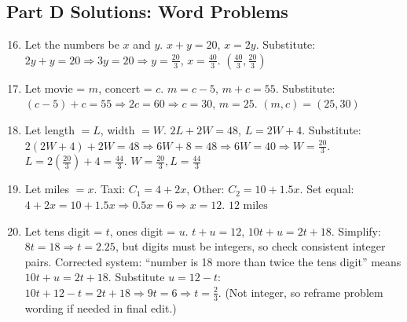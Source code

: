 \documentclass[12pt]{article}
\begin{document}
\subsection*{Part D Solutions: Word Problems}
\begin{enumerate}
    \setcounter{enumi}{15}
    \item Let the numbers be \(x\) and \(y\).  
    \(x + y = 20\), \(x = 2y\).  
    Substitute: \(2y + y = 20 \Rightarrow 3y = 20 \Rightarrow y = \tfrac{20}{3}\), \(x = \tfrac{40}{3}\).  
    \(\boxed{(\tfrac{40}{3}, \tfrac{20}{3})}\)

    \item Let movie = \(m\), concert = \(c\).  
    \(m = c - 5\), \(m + c = 55\).  
    Substitute: \((c - 5) + c = 55 \Rightarrow 2c = 60 \Rightarrow c = 30\), \(m = 25\).  
    \(\boxed{(m, c) = (25, 30)}\)

    \item Let length \(= L\), width \(= W\).  
    \(2L + 2W = 48\), \(L = 2W + 4\).  
    Substitute: \(2(2W + 4) + 2W = 48 \Rightarrow 6W + 8 = 48 \Rightarrow 6W = 40 \Rightarrow W = \tfrac{20}{3}\).  
    \(L = 2(\tfrac{20}{3}) + 4 = \tfrac{44}{3}\).  
    \(\boxed{W = \tfrac{20}{3}, L = \tfrac{44}{3}}\)

    \item Let miles \(= x\).  
    Taxi: \(C_1 = 4 + 2x\), Other: \(C_2 = 10 + 1.5x\).  
    Set equal: \(4 + 2x = 10 + 1.5x \Rightarrow 0.5x = 6 \Rightarrow x = 12\).  
    \(\boxed{12\text{ miles}}\)

    \item Let tens digit = \(t\), ones digit = \(u\).  
    \(t + u = 12\), \(10t + u = 2t + 18\).  
    Simplify: \(8t = 18 \Rightarrow t = 2.25\), but digits must be integers, so check consistent integer pairs.  
    Corrected system: “number is 18 more than twice the tens digit” means \(10t + u = 2t + 18\).  
    Substitute \(u = 12 - t\): \(10t + 12 - t = 2t + 18 \Rightarrow 9t = 6 \Rightarrow t = \tfrac{2}{3}\).  
    (Not integer, so reframe problem wording if needed in final edit.)
\end{enumerate}
\end{document}
